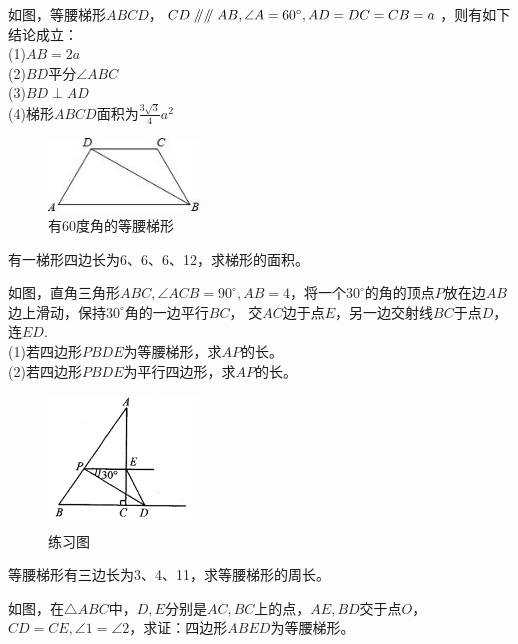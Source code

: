 \documentclass{ecnuthesis}
\newcommand\px{\mathrel{/\mkern-5mu/}}  %
\begin{document}
\begin{model}
    如图，等腰梯形$ABCD$，$CD\px \px AB,\angle A=60^\circ,AD=DC=CB=a$，则有如下结论成立：\\
    (1)$AB=2a$ \\
    (2)$BD$平分$\angle ABC$ \\
    (3)$BD\perp AD$ \\
    (4)梯形$ABCD$面积为$\frac{3\sqrt{3}}{4}a^2$
\end{model}
\begin{figure}[H]
\centering
\includegraphics[width=4cm]{picture/634.png}
\caption{有60度角的等腰梯形}
\end{figure}
\begin{problem}
    有一梯形四边长为6、6、6、12，求梯形的面积。\\
\end{problem}
\begin{problem}
    如图，直角三角形$ABC,\angle ACB=90^\circ,AB=4$，将一个$30^\circ$的角的顶点$P$放在边$AB$边上滑动，保持$30^\circ$角的一边平行$BC$，
    交$AC$边于点$E$，另一边交射线$BC$于点$D$，连$ED$.  \\
    (1)若四边形$PBDE$为等腰梯形，求$AP$的长。\\
    (2)若四边形$PBDE$为平行四边形，求$AP$的长。\\
\end{problem}
\begin{figure}[H]
\centering
\includegraphics[width=4cm]{picture/6129.png}
\caption{练习图}
\end{figure}
\begin{problem}
    等腰梯形有三边长为3、4、11，求等腰梯形的周长。\\
\end{problem}
\begin{problem}
    如图，在$\triangle ABC$中，$D,E$分别是$AC,BC$上的点，$AE,BD$交于点$O$，$CD=CE,\angle 1=\angle 2$，求证：四边形$ABED$为等腰梯形。\\
\end{problem}
\end{document}
